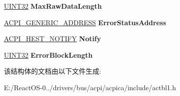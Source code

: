 \begin{DoxyCompactItemize}
\hyperlink{_processor_bind_8h_ae1e6edbbc26d6fbc71a90190d0266018}{U\+I\+N\+T32} {\bfseries Max\+Raw\+Data\+Length}
\item 
\mbox{\label{structacpi__hest__generic_ab73928017f26e199aa1322a6c6688aea}} 
\hyperlink{structacpi__generic__address}{A\+C\+P\+I\+\_\+\+G\+E\+N\+E\+R\+I\+C\+\_\+\+A\+D\+D\+R\+E\+SS} {\bfseries Error\+Status\+Address}
\item 
\mbox{\label{structacpi__hest__generic_ad730cbc6064a5effac4fe6d81a475c66}} 
\hyperlink{structacpi__hest__notify}{A\+C\+P\+I\+\_\+\+H\+E\+S\+T\+\_\+\+N\+O\+T\+I\+FY} {\bfseries Notify}
\item 
\mbox{\label{structacpi__hest__generic_a3c0ab4ed192af18160d582dbb01548a4}} 
\hyperlink{_processor_bind_8h_ae1e6edbbc26d6fbc71a90190d0266018}{U\+I\+N\+T32} {\bfseries Error\+Block\+Length}
\end{DoxyCompactItemize}


该结构体的文档由以下文件生成\+:\begin{DoxyCompactItemize}
\item 
E\+:/\+React\+O\+S-\/0../drivers/bus/acpi/acpica/include/actbl1.\+h\end{DoxyCompactItemize}
